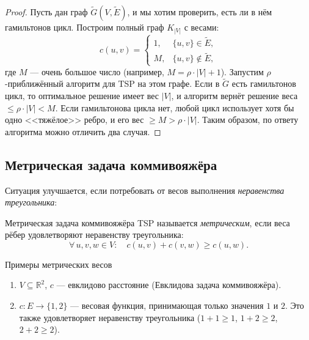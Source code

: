 \begin{proof}
	Пусть дан граф $\widetilde{G}(V,\widetilde{E})$, и мы хотим проверить, есть ли в нём гамильтонов цикл. Построим полный граф $K_{|V|}$ с весами:
	\[
	c(u,v) = \begin{cases} 1, & \{u,v\} \in \widetilde{E}, \\ M, & \{u,v\} \notin \widetilde{E}, \end{cases}
	\]
	где $M$ --- очень большое число (например, $M = \rho\cdot|V|+1$). Запустим $\rho$-приближённый алгоритм для TSP на этом графе. Если в $\widetilde{G}$ есть гамильтонов цикл, то оптимальное решение имеет вес $|V|$, и алгоритм вернёт решение веса $\leq \rho\cdot|V| < M$. Если гамильтонова цикла нет, любой цикл использует хотя бы одно <<тяжёлое>> ребро, и его вес $\geq M > \rho\cdot|V|$. Таким образом, по ответу алгоритма можно отличить два случая.
\end{proof}

\subsection{Метрическая задача коммивояжёра}

Ситуация улучшается, если потребовать от весов выполнения \emph{неравенства треугольника}:

\begin{Definition}{Метрическая задача коммивояжёра}{}
	TSP называется \emph{метрическим}, если веса рёбер удовлетворяют неравенству треугольника:
	\[
	\forall\, u,v,w \in V \colon\quad c(u,v) + c(v,w) \geq c(u,w).
	\]
\end{Definition}

\begin{Example}{Примеры метрических весов}{}
	\begin{enumerate}
		\item $V \subseteq \mathbb{R}^2$, $c$ --- евклидово расстояние (Евклидова задача коммивояжёра).
		\item $c\colon E \to \{1,2\}$ --- весовая функция, принимающая только значения $1$ и $2$. Это также удовлетворяет неравенству треугольника ($1+1 \geq 1$, $1+2 \geq 2$, $2+2 \geq 2$).
	\end{enumerate}
	
	\begin{center}
	\end{center}
\end{Example}


